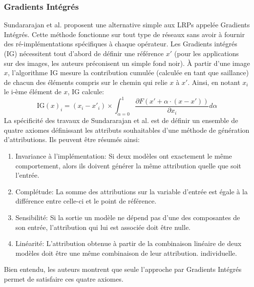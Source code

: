 \subsubsection{Gradients Intégrés}
Sundararajan et al. \cite{sundararajanAxiomaticAttributionDeep2017} proposent une alternative simple aux LRPs appelée Gradients Intégrés. Cette méthode fonctionne sur tout type de réseaux sans avoir à fournir des ré-implémentations spécifiques à chaque opérateur. Les Gradients intégrés (IG) nécessitent tout d'abord de définir une référence $x'$ (pour les applications sur des images, les auteurs préconisent un simple fond noir). À partir d'une image $x$, l'algorithme IG mesure la contribution cumulée (calculée en tant que saillance) de chacun des éléments compris sur le chemin qui relie $x$ à $x'$. Ainsi, en notant $x_i$ le i-ème élément de $x$, IG calcule:
\begin{equation}
	\text{IG}(x)_i = (x_i - x'_i) \times \int_{\alpha=0}^{1}
	\frac{\partial F(x'+\alpha \cdot (x-x'))}{\partial x_i} d\alpha
\end{equation}
La spécificité des travaux de Sundararajan et al. est de définir un ensemble de quatre axiomes définissant les attributs souhaitables d'une méthode de génération d'attributions. Ils peuvent être résumés ainsi:
\begin{enumerate}
	\item Invariance à l'implémentation: Si deux modèles ont exactement le même comportement, alors ils doivent générer la même attribution quelle que soit l'entrée.
	\item Complétude: La somme des attributions sur la variable d'entrée est égale à la différence entre celle-ci et le point de référence.
	\item Sensibilité: Si la sortie un modèle ne dépend pas d'une des composantes de son entrée, l'attribution qui lui est associée doit être nulle.
	\item Linéarité: L'attribution obtenue à partir de la combinaison linéaire de deux modèles doit être une même combinaison de leur attribution. individuelle.
\end{enumerate}
Bien entendu, les auteurs montrent que seule l'approche par Gradients Intégrés permet de satisfaire ces quatre axiomes. 
\newpage
